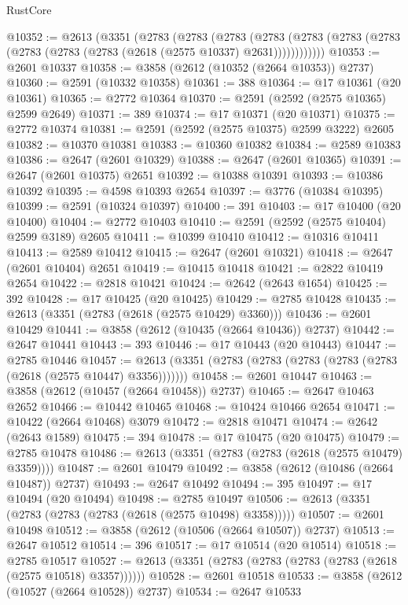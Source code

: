 \begin{lexlean}{RustCore}
\begin{coremodule}
@10352 := @2613
    (@3351
      (@2783
        (@2783
          (@2783
            (@2783 (@2783 (@2783 (@2783 (@2783 (@2783 (@2783 (@2618 (@2575 @10337) @2631))))))))))))
@10353 := @2601 @10337
@10358 := @3858 (@2612 (@10352 (@2664 @10353)) @2737)
@10360 := @2591 (@10332 @10358)
@10361 := 388
@10364 := @17 @10361 (@20 @10361)
@10365 := @2772 @10364
@10370 := @2591 (@2592 (@2575 @10365) @2599 @2649)
@10371 := 389
@10374 := @17 @10371 (@20 @10371)
@10375 := @2772 @10374
@10381 := @2591 (@2592 (@2575 @10375) @2599 @3222) @2605
@10382 := @10370 @10381
@10383 := @10360 @10382
@10384 := @2589 @10383
@10386 := @2647 (@2601 @10329)
@10388 := @2647 (@2601 @10365)
@10391 := @2647 (@2601 @10375) @2651
@10392 := @10388 @10391
@10393 := @10386 @10392
@10395 := @4598 @10393 @2654
@10397 := @3776 (@10384 @10395)
@10399 := @2591 (@10324 @10397)
@10400 := 391
@10403 := @17 @10400 (@20 @10400)
@10404 := @2772 @10403
@10410 := @2591 (@2592 (@2575 @10404) @2599 @3189) @2605
@10411 := @10399 @10410
@10412 := @10316 @10411
@10413 := @2589 @10412
@10415 := @2647 (@2601 @10321)
@10418 := @2647 (@2601 @10404) @2651
@10419 := @10415 @10418
@10421 := @2822 @10419 @2654
@10422 := @2818 @10421
@10424 := @2642 (@2643 @1654)
@10425 := 392
@10428 := @17 @10425 (@20 @10425)
@10429 := @2785 @10428
@10435 := @2613 (@3351 (@2783 (@2618 (@2575 @10429) @3360)))
@10436 := @2601 @10429
@10441 := @3858 (@2612 (@10435 (@2664 @10436)) @2737)
@10442 := @2647 @10441
@10443 := 393
@10446 := @17 @10443 (@20 @10443)
@10447 := @2785 @10446
@10457 := @2613 (@3351 (@2783 (@2783 (@2783 (@2783 (@2783 (@2618 (@2575 @10447) @3356)))))))
@10458 := @2601 @10447
@10463 := @3858 (@2612 (@10457 (@2664 @10458)) @2737)
@10465 := @2647 @10463 @2652
@10466 := @10442 @10465
@10468 := @10424 @10466 @2654
@10471 := @10422 (@2664 @10468) @3079
@10472 := @2818 @10471
@10474 := @2642 (@2643 @1589)
@10475 := 394
@10478 := @17 @10475 (@20 @10475)
@10479 := @2785 @10478
@10486 := @2613 (@3351 (@2783 (@2783 (@2618 (@2575 @10479) @3359))))
@10487 := @2601 @10479
@10492 := @3858 (@2612 (@10486 (@2664 @10487)) @2737)
@10493 := @2647 @10492
@10494 := 395
@10497 := @17 @10494 (@20 @10494)
@10498 := @2785 @10497
@10506 := @2613 (@3351 (@2783 (@2783 (@2783 (@2618 (@2575 @10498) @3358)))))
@10507 := @2601 @10498
@10512 := @3858 (@2612 (@10506 (@2664 @10507)) @2737)
@10513 := @2647 @10512
@10514 := 396
@10517 := @17 @10514 (@20 @10514)
@10518 := @2785 @10517
@10527 := @2613 (@3351 (@2783 (@2783 (@2783 (@2783 (@2618 (@2575 @10518) @3357))))))
@10528 := @2601 @10518
@10533 := @3858 (@2612 (@10527 (@2664 @10528)) @2737)
@10534 := @2647 @10533

\end{coremodule}
\end{lexlean}
